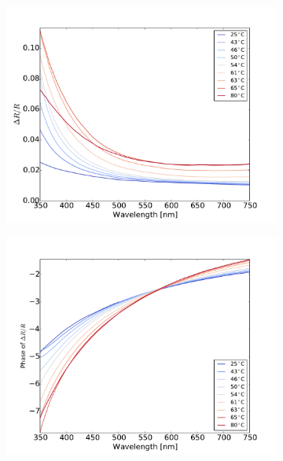 \begin{figure}
    \centering
    \begin{subfigure}[b]{0.3\textwidth}
        \centering
        \includegraphics[width=\textwidth]{Results/Sim2/dR_visible.pdf}
        \caption{}
    \end{subfigure}
    \begin{subfigure}[b]{0.3\textwidth}
        \centering
        \includegraphics[width=\textwidth]{Results/Sim2/dRphase_visible.pdf}
        \caption{}
    \end{subfigure}

\end{figure}
